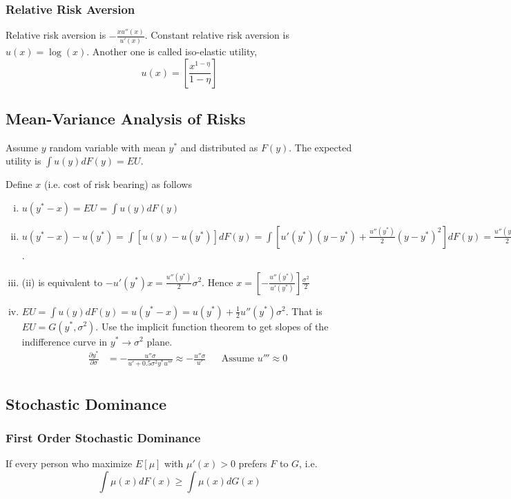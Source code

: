 \documentclass[11pt, a4paper, oneside]{article}
\theoremstyle{definition}
\theoremstyle{proposition}
\theoremstyle{corollary}
\theoremstyle{lemma}
\theoremstyle{theorem}
\begin{document}
\subsubsection{Relative Risk Aversion}
Relative risk aversion is $-\frac{xu''(x)}{u'(x)}$. Constant relative risk aversion is $u(x) = \log(x)$. Another one is called iso-elastic utility,
\[
u(x) =\left[\frac{x^{1-\eta}}{1-\eta}\right]
\]

\subsection{Mean-Variance Analysis of Risks}
Assume $y$ random variable with mean $y^*$ and distributed as $F(y)$. The expected utility is $\int u(y)dF(y) = EU$.

Define $x$ (i.e. cost of risk bearing) as follows
\begin{enumerate}[(i)]
\item $u(y^*-x) = EU = \int u(y)dF(y)$
\item $u(y^* - x) - u(y^*) = \int [u(y) - u(y^*)]dF(y) = \int\left[u'(y^*)(y-y^*)+\frac{u''(y^*)}{2}(y-y^*)^2\right]dF(y)=\frac{u''(y^*)}{2}Var(y)$. 
\item (ii) is equivalent to $-u'(y^*)x = \frac{u''(y^*)}{2}\sigma^2$. Hence $x = \left[-\frac{u''(y^*)}{u'(y^*)}\right]\frac{\sigma^2}{2}$
\item $EU = \int u(y)dF(y) =u(y^*-x) = u(y^*) + \frac{1}{2}u''(y^*)\sigma^2$. That is $EU = G(y^*, \sigma^2)$. Use the implicit function theorem to get slopes of the indifference curve in $y^* \to \sigma^2$ plane. 
\begin{align*}
\frac{\partial y^*}{\partial \sigma} &= -\frac{u''\sigma}{u'+0.5 \sigma^2 y^* u'''} \approx -\frac{u''\sigma}{u'} &&\text{Assume $u'''\approx 0$} \\
\end{align*}
\end{enumerate}

\subsection{Stochastic Dominance}
\subsubsection{First Order Stochastic Dominance}
If every person who maximize $E[\mu]$ with $\mu'(x) > 0$ prefers $F$ to $G$, i.e.
$$\int \mu(x) dF(x)\geq \int \mu(x)dG(x)$$
\end{document}
